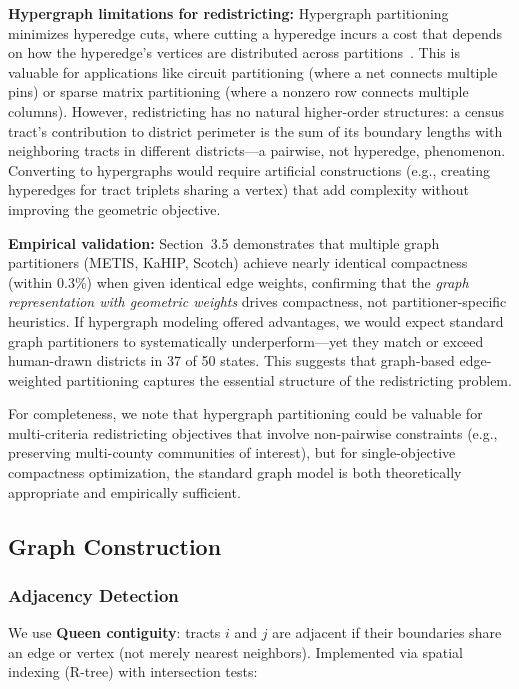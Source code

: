 \textbf{Hypergraph limitations for redistricting:} Hypergraph partitioning minimizes hyperedge cuts, where cutting a hyperedge incurs a cost that depends on how the hyperedge's vertices are distributed across partitions~\cite{catalyurek2011recent}. This is valuable for applications like circuit partitioning (where a net connects multiple pins) or sparse matrix partitioning (where a nonzero row connects multiple columns). However, redistricting has no natural higher-order structures: a census tract's contribution to district perimeter is the sum of its boundary lengths with neighboring tracts in different districts—a pairwise, not hyperedge, phenomenon. Converting to hypergraphs would require artificial constructions (e.g., creating hyperedges for tract triplets sharing a vertex) that add complexity without improving the geometric objective.

\textbf{Empirical validation:} Section~3.5 demonstrates that multiple graph partitioners (METIS, KaHIP, Scotch) achieve nearly identical compactness (within 0.3\%) when given identical edge weights, confirming that the \textit{graph representation with geometric weights} drives compactness, not partitioner-specific heuristics. If hypergraph modeling offered advantages, we would expect standard graph partitioners to systematically underperform—yet they match or exceed human-drawn districts in 37 of 50 states. This suggests that graph-based edge-weighted partitioning captures the essential structure of the redistricting problem.

For completeness, we note that hypergraph partitioning could be valuable for multi-criteria redistricting objectives that involve non-pairwise constraints (e.g., preserving multi-county communities of interest), but for single-objective compactness optimization, the standard graph model is both theoretically appropriate and empirically sufficient.

\subsection{Graph Construction}

\subsubsection{Adjacency Detection}

We use \textbf{Queen contiguity}: tracts $i$ and $j$ are adjacent if their boundaries share an edge or vertex (not merely nearest neighbors). Implemented via spatial indexing (R-tree) with intersection tests:

